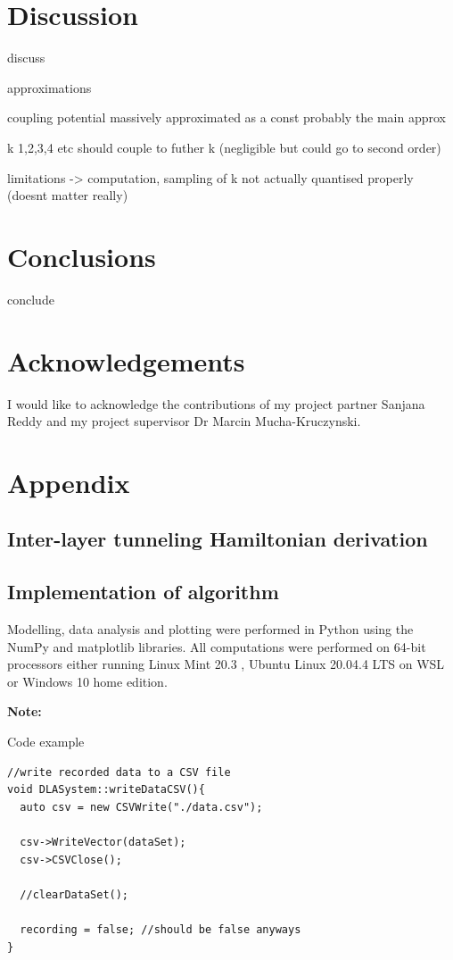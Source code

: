 \documentclass[12pt]{report} %
\begin{document}
\section*{Discussion}
discuss

approximations

coupling potential massively approximated as a const
probably the main approx

k 1,2,3,4 etc should couple to futher k (negligible but could go to second order)

limitations -> computation, sampling of k not actually quantised properly (doesnt matter really)

\section*{Conclusions}

conclude

\section*{Acknowledgements}
I would like to acknowledge the contributions of my project partner Sanjana Reddy and my project supervisor Dr Marcin Mucha-Kruczynski.




\clearpage

\onecolumn

\section*{Appendix}

\subsection*{Inter-layer tunneling Hamiltonian derivation}

\subsection*{Implementation of algorithm}
  Modelling, data analysis and plotting were performed in Python using the NumPy and matplotlib libraries. All computations were performed on 64-bit processors either running Linux Mint 20.3 , Ubuntu Linux 20.04.4 LTS on WSL or Windows 10 home edition.

  \textbf{Note: }

  Code example
\begin{lstlisting}
//write recorded data to a CSV file
void DLASystem::writeDataCSV(){
  auto csv = new CSVWrite("./data.csv");

  csv->WriteVector(dataSet);
  csv->CSVClose();

  //clearDataSet();

  recording = false; //should be false anyways
}
\end{lstlisting}
\end{document}
